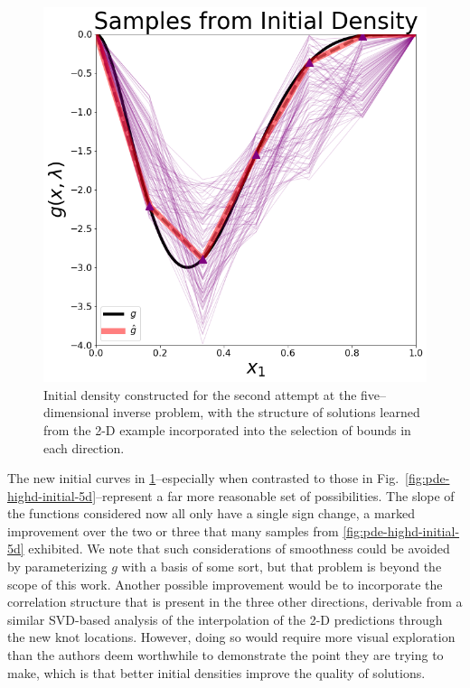 \begin{figure}[htbp]
\centering
  \includegraphics[width=0.675\linewidth]{figures/pde-highd/pde-highd_init_D5-alt}
\caption{
Initial density constructed for the second attempt at the five--dimensional inverse problem, with the structure of solutions learned from the 2-D example incorporated into the selection of bounds in each direction.
}
\label{fig:pde-highd-alt-initial-5d}
\end{figure}

The new initial curves in \ref{fig:pde-highd-alt-initial-5d}\---especially when contrasted to those in Fig.~\ref{fig:pde-highd-initial-5d}\---represent a far more reasonable set of possibilities.
The slope of the functions considered now all only have a single sign change, a marked improvement over the two or three that many samples from \ref{fig:pde-highd-initial-5d} exhibited.
We note that such considerations of smoothness could be avoided by parameterizing $g$ with a basis of some sort, but that problem is beyond the scope of this work.
Another possible improvement would be to incorporate the correlation structure that is present in the three other directions, derivable from a similar SVD-based analysis of the interpolation of the 2-D predictions through the new knot locations.
However, doing so would require more visual exploration than the authors deem worthwhile to demonstrate the point they are trying to make, which is that better initial densities improve the quality of solutions.

